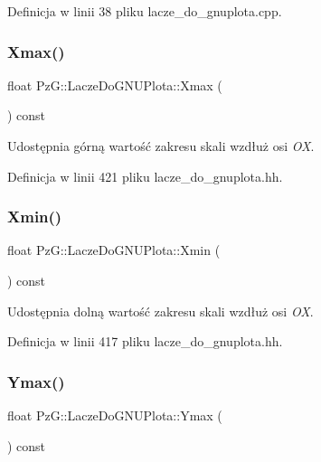 Definicja w linii 38 pliku lacze\+\_\+do\+\_\+gnuplota.\+cpp.

\mbox{\label{class_pz_g_1_1_lacze_do_g_n_u_plota_a8e23479629af3df3d352b7839ae396b8}} 
\subsubsection{\texorpdfstring{Xmax()}{Xmax()}}
{\footnotesize\ttfamily float Pz\+G\+::\+Lacze\+Do\+G\+N\+U\+Plota\+::\+Xmax (\begin{DoxyParamCaption}{ }\end{DoxyParamCaption}) const\hspace{0.3cm}{\ttfamily [inline]}}

Udostępnia górną wartość zakresu skali wzdłuż osi {\itshape OX}. 

Definicja w linii 421 pliku lacze\+\_\+do\+\_\+gnuplota.\+hh.

\mbox{\label{class_pz_g_1_1_lacze_do_g_n_u_plota_a66836c9749bf179420e4ca3e9447efd7}} 
\subsubsection{\texorpdfstring{Xmin()}{Xmin()}}
{\footnotesize\ttfamily float Pz\+G\+::\+Lacze\+Do\+G\+N\+U\+Plota\+::\+Xmin (\begin{DoxyParamCaption}{ }\end{DoxyParamCaption}) const\hspace{0.3cm}{\ttfamily [inline]}}

Udostępnia dolną wartość zakresu skali wzdłuż osi {\itshape OX}. 

Definicja w linii 417 pliku lacze\+\_\+do\+\_\+gnuplota.\+hh.

\mbox{\label{class_pz_g_1_1_lacze_do_g_n_u_plota_ac54e4e7448ce3bd324efdc94a999f535}} 
\subsubsection{\texorpdfstring{Ymax()}{Ymax()}}
{\footnotesize\ttfamily float Pz\+G\+::\+Lacze\+Do\+G\+N\+U\+Plota\+::\+Ymax (\begin{DoxyParamCaption}{ }\end{DoxyParamCaption}) const\hspace{0.3cm}{\ttfamily [inline]}}

